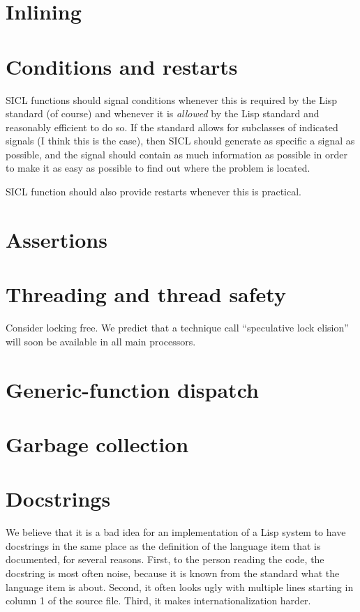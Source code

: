 \documentclass{article}
\def\sysname{SICL}
\begin{document}
\section{Inlining}

\section{Conditions and restarts}

\sysname{} functions should signal conditions whenever this is
required by the Lisp standard (of course) and whenever it is
\emph{allowed} by the Lisp standard and reasonably efficient to do
so.  If the standard allows for subclasses of indicated signals (I
think this is the case), then \sysname{} should generate as specific a
signal as possible, and the signal should contain as much information
as possible in order to make it as easy as possible to find out where
the problem is located. 

\sysname{} function should also provide restarts whenever this is
practical. 

\section{Assertions}

\section{Threading and thread safety}

Consider locking free.  We predict that a technique call ``speculative
lock elision'' will soon be available in all main processors. 

\section{Generic-function dispatch}

\section{Garbage collection}

\section{Docstrings}

We believe that it is a bad idea for an implementation of a Lisp
system to have docstrings in the same place as the definition of the
language item that is documented, for several reasons.  First, to the
person reading the code, the docstring is most often noise, because it
is known from the standard what the language item is about.  Second,
it often looks ugly with multiple lines starting in column 1 of the
source file.  Third, it makes internationalization harder.
\end{document}
